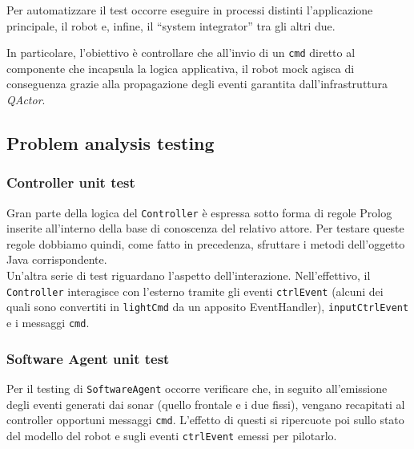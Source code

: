 \documentclass{../llncs}
\newcommand{\codescript}[1]{{\mbox{\small{\texttt{#1}}}}\xspace}
\newcommand{\qa}{\textsf{\textit{QActor}}\xspace}
\begin{document}
Per automatizzare il test occorre eseguire in processi distinti l'applicazione principale, il robot e, infine,
il ``system integrator'' tra gli altri due.

In particolare, l'obiettivo è controllare che all'invio di un \codescript{cmd} diretto al componente che incapsula la logica applicativa, il robot mock agisca di conseguenza grazie alla propagazione degli eventi garantita dall'infrastruttura {\qa}.\\



\subsection{Problem analysis testing}

\subsubsection{Controller unit test}
Gran parte della logica del \texttt{Controller} è espressa sotto forma di regole Prolog inserite all'interno della base di conoscenza del relativo attore. Per testare queste regole dobbiamo quindi, come fatto in precedenza, sfruttare i metodi dell'oggetto Java corrispondente.\\



Un'altra serie di test riguardano l'aspetto dell'interazione. Nell'effettivo, il \texttt{Controller} interagisce con l'esterno tramite gli eventi \codescript{ctrlEvent} (alcuni dei quali sono convertiti in \codescript{lightCmd} da un apposito EventHandler), \codescript{inputCtrlEvent} e i messaggi \codescript{cmd}.\\



\subsubsection{Software Agent unit test}
Per il testing di \texttt{SoftwareAgent} occorre verificare che, in seguito all'emissione degli eventi generati dai sonar (quello frontale e i due fissi), vengano recapitati al controller opportuni messaggi \codescript{cmd}. L'effetto di questi si ripercuote poi sullo stato del modello del robot e sugli eventi \codescript{ctrlEvent} emessi per pilotarlo.\\
\end{document}
